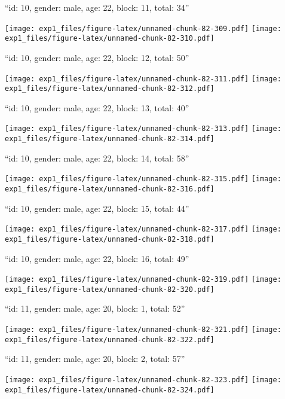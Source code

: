 \documentclass[11pt,,]{article}
\begin{document}
\newpage
[1] 

``id: 10, gender: male, age: 22, block: 11, total: 34''

\texttt{[image: exp1\_files/figure-latex/unnamed-chunk-82-309.pdf]}
\texttt{[image: exp1\_files/figure-latex/unnamed-chunk-82-310.pdf]}

\newpage
[1] 

``id: 10, gender: male, age: 22, block: 12, total: 50''

\texttt{[image: exp1\_files/figure-latex/unnamed-chunk-82-311.pdf]}
\texttt{[image: exp1\_files/figure-latex/unnamed-chunk-82-312.pdf]}

\newpage
[1] 

``id: 10, gender: male, age: 22, block: 13, total: 40''

\texttt{[image: exp1\_files/figure-latex/unnamed-chunk-82-313.pdf]}
\texttt{[image: exp1\_files/figure-latex/unnamed-chunk-82-314.pdf]}

\newpage
[1] 

``id: 10, gender: male, age: 22, block: 14, total: 58''

\texttt{[image: exp1\_files/figure-latex/unnamed-chunk-82-315.pdf]}
\texttt{[image: exp1\_files/figure-latex/unnamed-chunk-82-316.pdf]}

\newpage
[1] 

``id: 10, gender: male, age: 22, block: 15, total: 44''

\texttt{[image: exp1\_files/figure-latex/unnamed-chunk-82-317.pdf]}
\texttt{[image: exp1\_files/figure-latex/unnamed-chunk-82-318.pdf]}

\newpage
[1] 

``id: 10, gender: male, age: 22, block: 16, total: 49''

\texttt{[image: exp1\_files/figure-latex/unnamed-chunk-82-319.pdf]}
\texttt{[image: exp1\_files/figure-latex/unnamed-chunk-82-320.pdf]}

\newpage
[1] 

``id: 11, gender: male, age: 20, block: 1, total: 52''

\texttt{[image: exp1\_files/figure-latex/unnamed-chunk-82-321.pdf]}
\texttt{[image: exp1\_files/figure-latex/unnamed-chunk-82-322.pdf]}

\newpage
[1] 

``id: 11, gender: male, age: 20, block: 2, total: 57''

\texttt{[image: exp1\_files/figure-latex/unnamed-chunk-82-323.pdf]}
\texttt{[image: exp1\_files/figure-latex/unnamed-chunk-82-324.pdf]}
\end{document}
